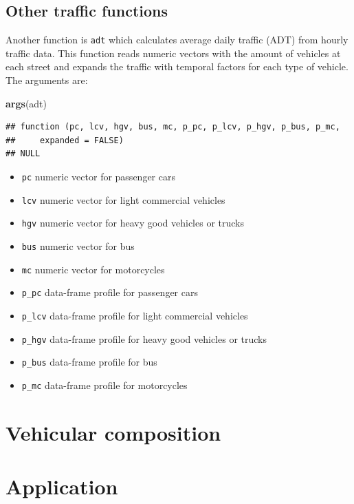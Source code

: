 \documentclass[12pt,graybox,envcountchap,sectrefs]{krantz}
\makeatletter
\newenvironment{Shaded}{\begin{snugshade}}{\end{snugshade}}
\newcommand{\KeywordTok}[1]{\textcolor[rgb]{0.13,0.29,0.53}{\textbf{#1}}}
\newcommand{\NormalTok}[1]{#1}
\providecommand{\tightlist}{%
  \setlength{\itemsep}{0pt}\setlength{\parskip}{0pt}}
\newenvironment{kframe}{%
\medskip{}
\setlength{\fboxsep}{.8em}
 \def\at@end@of@kframe{}%
 \ifinner\ifhmode%
  \def\at@end@of@kframe{\end{minipage}}%
  \begin{minipage}{\columnwidth}%
 \fi\fi%
 \def\FrameCommand##1{\hskip\@totalleftmargin \hskip-\fboxsep
 \colorbox{shadecolor}{##1}\hskip-\fboxsep
     \hskip-\linewidth \hskip-\@totalleftmargin \hskip\columnwidth}%
 \MakeFramed {\advance\hsize-\width
   \@totalleftmargin\z@ \linewidth\hsize
   \@setminipage}}%
 {\par\unskip\endMakeFramed%
 \at@end@of@kframe}
\renewenvironment{Shaded}{\begin{kframe}}{\end{kframe}}
\theoremstyle{definition}
\theoremstyle{definition}
\theoremstyle{definition}
\theoremstyle{remark}
\makeatother
\begin{document}
\subsection{Other traffic functions}\label{other-traffic-functions}

Another function is \texttt{adt} which calculates average daily traffic
(ADT) from hourly traffic data. This function reads numeric vectors with
the amount of vehicles at each street and expands the traffic with
temporal factors for each type of vehicle. The arguments are:

\begin{Shaded}
\begin{Highlighting}[]
\KeywordTok{args}\NormalTok{(adt)}
\end{Highlighting}
\end{Shaded}

\begin{verbatim}
## function (pc, lcv, hgv, bus, mc, p_pc, p_lcv, p_hgv, p_bus, p_mc, 
##     expanded = FALSE) 
## NULL
\end{verbatim}

\begin{itemize}
\tightlist
\item
  \texttt{pc} numeric vector for passenger cars
\item
  \texttt{lcv} numeric vector for light commercial vehicles
\item
  \texttt{hgv} numeric vector for heavy good vehicles or trucks
\item
  \texttt{bus} numeric vector for bus
\item
  \texttt{mc} numeric vector for motorcycles
\item
  \texttt{p\_pc} data-frame profile for passenger cars
\item
  \texttt{p\_lcv} data-frame profile for light commercial vehicles
\item
  \texttt{p\_hgv} data-frame profile for heavy good vehicles or trucks
\item
  \texttt{p\_bus} data-frame profile for bus
\item
  \texttt{p\_mc} data-frame profile for motorcycles
\end{itemize}

\section{Vehicular composition}\label{vehicular-composition}

\section{Application}\label{application}
\end{document}
